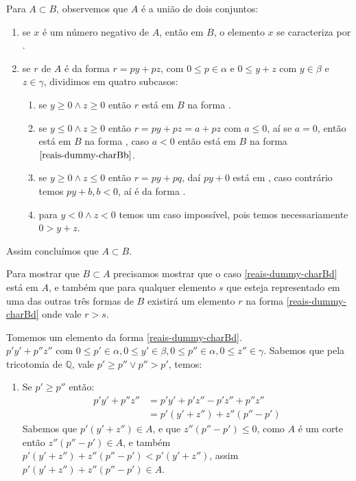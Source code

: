 \documentclass[../main.tex]{subfiles}
\begin{document}
\begin{dem}
    Para $ A \subset B$, observemos que $A$ é a união de dois conjuntos:
    \begin{enumerate}
        \item se $x$ é um número negativo de $A$, então em $B$, o elemento $x$ se caracteriza por .
        \item {se $r$ de $A$ é da forma $r = py + pz$, com $0 \leq p \in \alpha$ e $0 \leq y+z$ com $y \in \beta$ e $z \in \gamma$, dividimos em quatro subcasos:
            \begin{enumerate}
                \item se $y \geq 0 \land z \geq 0$ então $r$ está em $B$ na forma .
                \item se $y \leq 0 \land z \geq 0$ então $r = py+pz = a + pz$ com $a \leq 0$, aí se $a=0$, então está em $B$ na forma , caso $a < 0$ então está em $B$ na forma $\Cref{reais-dummy-charBb}$.
                \item se $y \geq 0 \land z \leq 0$ então $r = py + pq$, daí $py + 0$ está em , caso contrário temos $py + b, b< 0$, aí é da forma .
                \item para $y < 0 \land z < 0$ temos um caso impossível, pois temos necessariamente $0 > y+z$.
            \end{enumerate}
        }
    \end{enumerate}

    Assim concluímos que $A \subset B$.

    Para mostrar que $B \subset A$ precisamos mostrar que o caso \ref{reais-dummy-charBd} está em $A$, e também que para qualquer elemento $s$ que esteja representado em uma das outras três formas de $B$ existirá um elemento $r$ na forma \ref{reais-dummy-charBd} onde vale $r > s$.  
    
    Tomemos um elemento da forma \ref{reais-dummy-charBd}. \\
    $p'y' + p''z''$ com $0 \leq p' \in \alpha, 0 \leq y' \in \beta, 0 \leq p'' \in \alpha, 0 \leq z'' \in \gamma$. 
        Sabemos que pela tricotomia de $\mathbb{Q}$, vale $p' \geq p'' \lor p'' > p'$, temos:\\
        \begin{enumerate}
            \item Se $p' \geq p''$ então:
                \begin{align*}
                    p'y' + p''z'' &= p'y' + p'z'' - p'z'' + p''z'' \\
                    &= p'(y' + z'') + z''(p''-p') 
                \end{align*}
                Sabemos que $p'(y' + z'') \in A$, e que $z''(p''-p') \leq 0$, como $A$ é um corte então $z''(p''-p') \in A$, e também $p'(y' + z'')+z''(p''-p') < p'(y' + z'')$, assim $p'(y' + z'') + z''(p''-p') \in A$.
        

\end{enumerate}
\end{dem}
\end{document}
